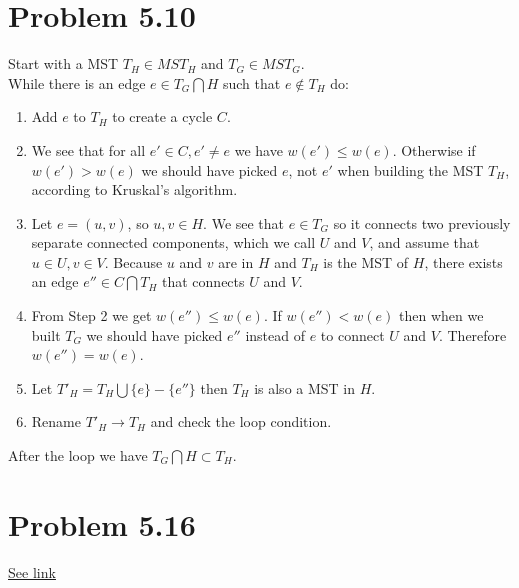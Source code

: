\documentclass[12pt]{report}
\begin{document}
\section{Problem 5.10}
Start with a MST $T_H \in MST_H$ and $T_G \in MST_G$. \\
While there is an edge $e \in T_G \bigcap H$ such that $e \notin T_H$ do:
\begin{enumerate}
  \item Add $e$ to $T_H$ to create a cycle $C$.
  \item We see that for all $e' \in C, e' \ne e$ we have $w(e') \le w(e)$. Otherwise if $w(e') > w(e)$ we should have picked $e$, not $e'$ when building the MST $T_H$, according to Kruskal's algorithm.
  \item Let $e = (u,v)$, so $u, v \in H$. We see that $e \in T_G$ so it connects two previously separate connected components, which we call $U$ and $V$, and assume that $u \in U, v \in V$. Because $u$ and $v$ are in $H$ and $T_H$ is the MST of $H$, there exists an edge $e'' \in C \bigcap T_H$ that connects $U$ and $V$. 
  \item From Step 2 we get $w(e'') \le w(e)$. If $w(e'') < w(e)$ then when we built $T_G$ we should have picked $e''$ instead of $e$ to connect $U$ and $V$. Therefore $w(e'') = w(e)$. 
  \item Let $T'_H = T_H \bigcup \{ e \} - \{ e''\}$ then $T_H$ is also a MST in $H$.
  \item Rename $T'_H \to T_H$ and check the loop condition.
\end{enumerate}

After the loop we have $T_G \bigcap H \subset T_H$.

\section{Problem 5.16}
\href{http://ocw.mit.edu/courses/electrical-engineering-and-computer-science/6-046j-design-and-analysis-of-algorithms-spring-2012/assignments/MIT6_046JS12_ps9_sol.pdf}{\underline{See link}}
\end{document}
